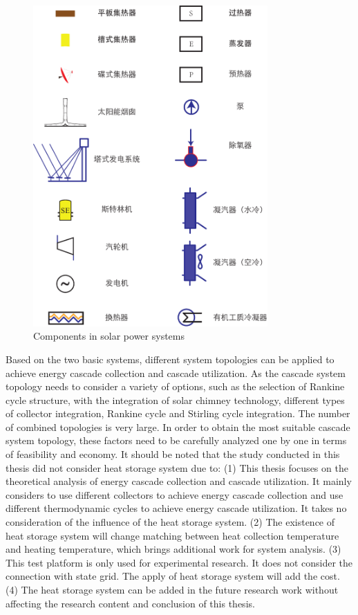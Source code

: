 \begin{figure}[!ht]
\centering
\includegraphics[width=0.8\textwidth]{fig/Legends.pdf}
\caption{Components in solar power systems}
\label{fig:Legends}
\end{figure}

Based on the two basic systems, different system topologies can be applied to achieve energy cascade collection and cascade utilization. As the cascade system topology needs to consider a variety of options, such as the selection of Rankine cycle structure, with the integration of solar chimney technology, different types of collector integration, Rankine cycle and Stirling cycle integration. The number of combined topologies is very large. In order to obtain the most suitable cascade system topology, these factors need to be carefully analyzed one by one in terms of feasibility and economy. It should be noted that the study conducted in this thesis did not consider heat storage system due to: (1) This thesis focuses on the theoretical analysis of energy cascade collection and cascade utilization. It mainly considers to use different collectors to achieve energy cascade collection and use different thermodynamic cycles to achieve energy cascade utilization. It takes no consideration of the influence of the heat storage system. (2) The existence of heat storage system will change matching between heat collection temperature and heating temperature, which brings additional work for system analysis. (3) This test platform is only used for experimental research. It does not consider the connection with state grid. The apply of heat storage system will add the cost. (4) The heat storage system can be added in the future research work without affecting the research content and conclusion of this thesis.

